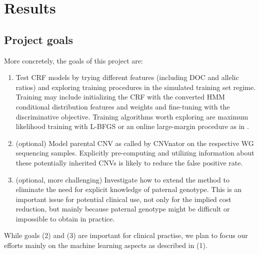 \section{Results}

\subsection{Project goals}
More concretely, the goals of this project are:

\begin{enumerate}

\item Test CRF models by trying different features (including DOC and allelic ratios) and exploring training procedures in the simulated training set regime. Training may include initializing the CRF with the converted HMM conditional distribution features and weights and fine-tuning with the discriminative objective. Training algorithms worth exploring are maximum likelihood training with L-BFGS or an online large-margin procedure as in \cite{bernal2007}.

\item (optional) Model parental CNV as called by CNVnator on the respective WG sequencing samples. Explicitly pre-computing and utilizing information about these potentially inherited CNVs is likely to reduce the false positive rate.

\item (optional, more challenging) Investigate how to extend the method to eliminate the need for explicit knowledge of paternal genotype. This is an important issue for potential clinical use, not only for the implied cost reduction, but mainly because paternal genotype might be difficult or impossible to obtain in practice.

\end{enumerate}
While goals (2) and (3) are important for clinical practise, we plan to focus our efforts mainly on the machine learning aspects as described in (1).


%
